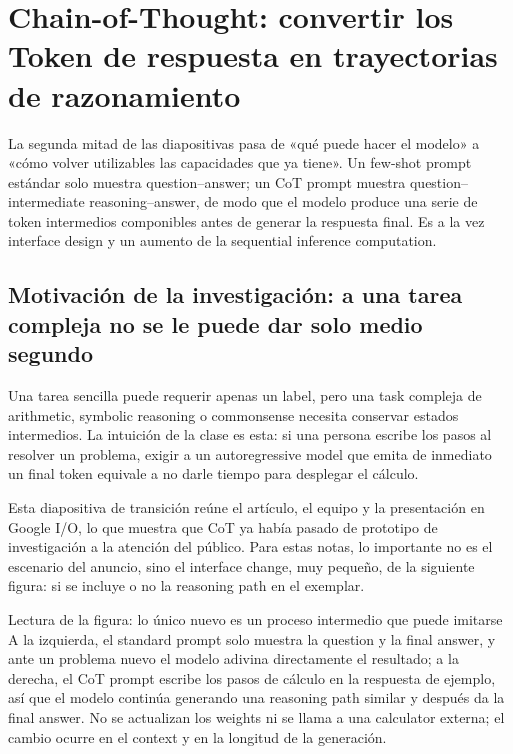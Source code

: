 \section{Chain-of-Thought: convertir los Token de respuesta en trayectorias de razonamiento}

La segunda mitad de las diapositivas pasa de «qué puede hacer el modelo» a «cómo volver utilizables las capacidades que ya tiene». Un few-shot prompt estándar solo muestra question--answer; un CoT prompt muestra question--intermediate reasoning--answer, de modo que el modelo produce una serie de token intermedios componibles antes de generar la respuesta final. Es a la vez interface design y un aumento de la sequential inference computation.

\subsection{Motivación de la investigación: a una tarea compleja no se le puede dar solo medio segundo}

Una tarea sencilla puede requerir apenas un label, pero una task compleja de arithmetic, symbolic reasoning o commonsense necesita conservar estados intermedios. La intuición de la clase es esta: si una persona escribe los pasos al resolver un problema, exigir a un autoregressive model que emita de inmediato un final token equivale a no darle tiempo para desplegar el cálculo.


Esta diapositiva de transición reúne el artículo, el equipo y la presentación en Google I/O, lo que muestra que CoT ya había pasado de prototipo de investigación a la atención del público. Para estas notas, lo importante no es el escenario del anuncio, sino el interface change, muy pequeño, de la siguiente figura: si se incluye o no la reasoning path en el exemplar.


\begin{knowledgebox}{Lectura de la figura: lo único nuevo es un proceso intermedio que puede imitarse}
A la izquierda, el standard prompt solo muestra la question y la final answer, y ante un problema nuevo el modelo adivina directamente el resultado; a la derecha, el CoT prompt escribe los pasos de cálculo en la respuesta de ejemplo, así que el modelo continúa generando una reasoning path similar y después da la final answer. No se actualizan los weights ni se llama a una calculator externa; el cambio ocurre en el context y en la longitud de la generación.
\end{knowledgebox}

